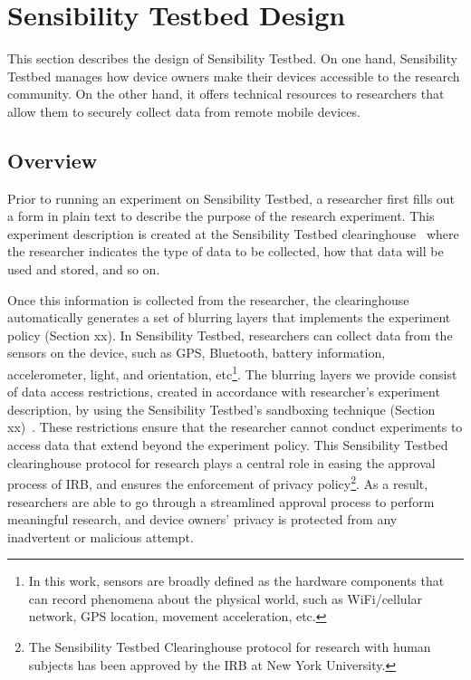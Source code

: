 \section{Sensibility Testbed Design}\label{sec-design}

This section describes the design of Sensibility Testbed. On one
hand, Sensibility Testbed manages how device owners make their
devices accessible to the research community. On the other hand,
it offers technical resources to researchers that allow them to
securely collect data from remote mobile devices.

\subsection{Overview}

Prior to running an experiment on Sensibility Testbed, a
researcher first fills out a form in plain text to describe the
purpose of the research experiment. This experiment description
is created at the Sensibility Testbed clearinghouse~\cite{ch}
where the researcher indicates the type of data to be collected,
how that data will be used and stored, and so on. 

Once this information is collected from the researcher, the
clearinghouse automatically generates a set of blurring layers
that implements the experiment policy (Section xx). In
Sensibility Testbed, researchers can collect data from the
sensors on the device, such as GPS, Bluetooth, battery
information, accelerometer, light, and orientation,
etc\footnote{In this work, sensors are broadly defined as the
hardware components that can record phenomena about the physical
world, such as WiFi/cellular network, GPS location, movement
acceleration, etc.}. The blurring layers we provide consist of
data access restrictions, created in accordance with
researcher's experiment description, by using the Sensibility
Testbed's sandboxing technique (Section
xx)~\cite{cappos2010retaining}. These restrictions ensure that
the researcher cannot conduct experiments to access data that
extend beyond the experiment policy. This Sensibility Testbed
clearinghouse protocol for research plays a central role in
easing the approval process of IRB, and ensures the enforcement
of privacy policy\footnote{The Sensibility Testbed Clearinghouse
protocol for research with human subjects has been approved by
the IRB at New York University. }. As a result, researchers
are able to go through a streamlined approval process to perform
meaningful research, and device owners' privacy is protected
from any inadvertent or malicious attempt.

